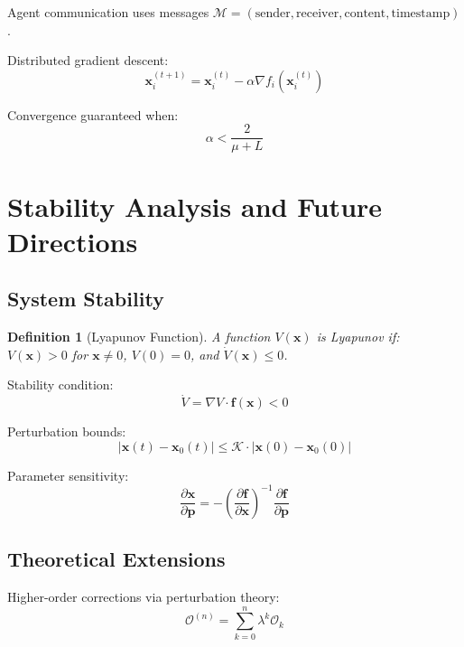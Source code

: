 \documentclass[12pt]{article}
\newtheorem{definition}[theorem]{Definition}
\begin{document}
Agent communication uses messages $\mathcal{M} = (\text{sender}, \text{receiver}, \text{content}, \text{timestamp})$.

Distributed gradient descent:
\begin{equation}
\mathbf{x}_{i}^{(t+1)} = \mathbf{x}_{i}^{(t)} - \alpha \nabla f_i(\mathbf{x}_{i}^{(t)})
\end{equation}

Convergence guaranteed when:
\begin{equation}
\alpha < \frac{2}{\mu + L}
\end{equation}

\section{Stability Analysis and Future Directions}

\subsection{System Stability}

\begin{definition}[Lyapunov Function]
A function $V(\mathbf{x})$ is Lyapunov if:
$V(\mathbf{x}) > 0$ for $\mathbf{x} \neq 0$, $V(0) = 0$, and $\dot{V}(\mathbf{x}) \leq 0$.
\end{definition}

Stability condition:
\begin{equation}
\dot{V} = \nabla V \cdot \mathbf{f}(\mathbf{x}) < 0
\end{equation}

Perturbation bounds:
\begin{equation}
|\mathbf{x}(t) - \mathbf{x}_0(t)| \leq \mathcal{K} \cdot |\mathbf{x}(0) - \mathbf{x}_0(0)|
\end{equation}

Parameter sensitivity:
\begin{equation}
\frac{\partial \mathbf{x}}{\partial \mathbf{p}} = -\left(\frac{\partial \mathbf{f}}{\partial \mathbf{x}}\right)^{-1} \frac{\partial \mathbf{f}}{\partial \mathbf{p}}
\end{equation}

\subsection{Theoretical Extensions}

Higher-order corrections via perturbation theory:
\begin{equation}
\mathcal{O}^{(n)} = \sum_{k=0}^{n} \lambda^k \mathcal{O}_k
\end{equation}
\end{document}
